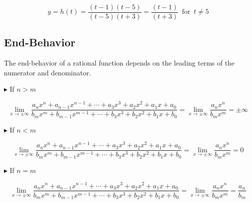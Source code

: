 \documentclass{ximera}
\begin{document}
\[ y = h(t) = \frac{(t-1)(t-5)}{(t-5)(t+3)} = \frac{(t-1)}{(t+3)}  \, \text{ for } \,  t \ne 5  \]










\subsection*{End-Behavior}



The end-behavior of a rational function depends on the leading terms of the numerator and denominator.





\textbf{\textcolor{red!90!darkgray}{$\blacktriangleright$}} If $n > m$




\[   \lim\limits_{x \to \pm\infty}  \frac{ a_n x^n + a_{n-1} x^{n-1} + \cdots + a_3 x^3 + a_2 x^2 + a_1 x + a_0  } { b_m x^m + b_{m-1} x^{m-1} + \cdots + b_3 x^3 + b_2 x^2 + b_1 x + b_0 }   = \lim\limits_{x \to \pm\infty} \frac{ a_n x^n } { b_m x^m } = \pm \infty
\]











\textbf{\textcolor{red!90!darkgray}{$\blacktriangleright$}} If $n < m$




\[  \lim\limits_{x \to \pm\infty} \frac{ a_n x^n + a_{n-1} x^{n-1} + \cdots + a_3 x^3 + a_2 x^2 + a_1 x + a_0  } { b_m x^m + b_{m-1} x^{m-1} + \cdots + b_3 x^3 + b_2 x^2 + b_1 x + b_0 }   = \lim\limits_{x \to \pm\infty} \frac{ a_n x^n } { b_m x^m } = 0
\]











\textbf{\textcolor{red!90!darkgray}{$\blacktriangleright$}} If $n = m$




\[  \lim\limits_{x \to \pm\infty} \frac{ a_n x^n + a_{n-1} x^{n-1} + \cdots + a_3 x^3 + a_2 x^2 + a_1 x + a_0  } { b_m x^m + b_{m-1} x^{m-1} + \cdots + b_3 x^3 + b_2 x^2 + b_1 x + b_0 }   =  \lim\limits_{x \to \pm\infty} \frac{ a_n x^n } { b_m x^m } = \frac{ a_n} { b_m }
\]
\end{document}
